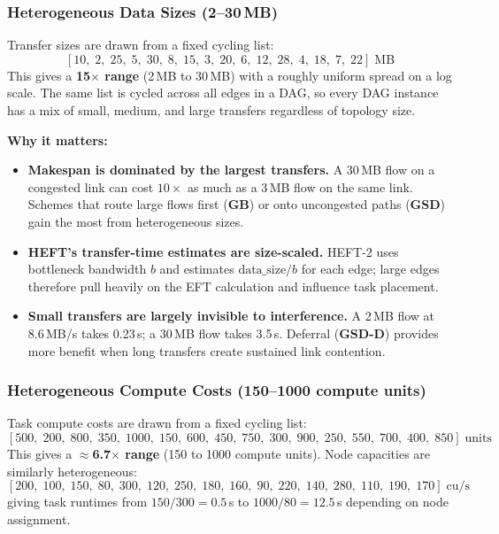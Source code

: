 \documentclass[11pt]{article}
\begin{document}
\subsubsection{Heterogeneous Data Sizes (2--30\,MB)}

Transfer sizes are drawn from a fixed cycling list:
\[
  [10,\; 2,\; 25,\; 5,\; 30,\; 8,\; 15,\; 3,\; 20,\; 6,\; 12,\; 28,\;
   4,\; 18,\; 7,\; 22]\;\text{MB}
\]
This gives a \textbf{15$\times$ range} (2\,MB to 30\,MB) with a roughly
uniform spread on a log scale.  The same list is cycled across all edges
in a DAG, so every DAG instance has a mix of small, medium, and large
transfers regardless of topology size.

\medskip
\textbf{Why it matters:}
\begin{itemize}
  \item \textbf{Makespan is dominated by the largest transfers.}  A 30\,MB
        flow on a congested link can cost $10\times$ as much as a 3\,MB
        flow on the same link.  Schemes that route large flows first
        (\textbf{GB}) or onto uncongested paths (\textbf{GSD}) gain the
        most from heterogeneous sizes.
  \item \textbf{HEFT's transfer-time estimates are size-scaled.}  HEFT-2
        uses bottleneck bandwidth $b$ and estimates
        $\text{data\_size}/b$ for each edge; large edges therefore pull
        heavily on the EFT calculation and influence task placement.
  \item \textbf{Small transfers are largely invisible to interference.}
        A 2\,MB flow at 8.6\,MB/s takes 0.23\,s; a 30\,MB flow takes
        3.5\,s.  Deferral (\textbf{GSD-D}) provides more benefit when
        long transfers create sustained link contention.
\end{itemize}

\subsubsection{Heterogeneous Compute Costs (150--1000 compute units)}

Task compute costs are drawn from a fixed cycling list:
\[
  [500,\; 200,\; 800,\; 350,\; 1000,\; 150,\; 600,\; 450,\; 750,\;
   300,\; 900,\; 250,\; 550,\; 700,\; 400,\; 850]\;\text{units}
\]
This gives a \textbf{$\approx$6.7$\times$ range} (150 to 1000 compute
units).  Node capacities are similarly heterogeneous:
\[
  [200,\; 100,\; 150,\; 80,\; 300,\; 120,\; 250,\; 180,\; 160,\; 90,\;
   220,\; 140,\; 280,\; 110,\; 190,\; 170]\;\text{cu/s}
\]
giving task runtimes from $150/300 = 0.5$\,s to $1000/80 = 12.5$\,s
depending on node assignment.
\end{document}
